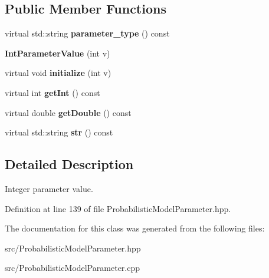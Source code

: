\subsection*{Public Member Functions}
\begin{DoxyCompactItemize}
\item 
\mbox{\label{classtops_1_1IntParameterValue_a4c4458e9fb9509cb6959257d7035bb20}} 
virtual std\+::string {\bfseries parameter\+\_\+type} () const
\item 
\mbox{\label{classtops_1_1IntParameterValue_a35cff2ce88a5d73eb510543a81c8c805}} 
{\bfseries Int\+Parameter\+Value} (int v)
\item 
\mbox{\label{classtops_1_1IntParameterValue_a21227ec31bb4b8ec1a7a61d999fd6f1f}} 
virtual void {\bfseries initialize} (int v)
\item 
\mbox{\label{classtops_1_1IntParameterValue_ae2a9175c5445b7c646488ce6787474c4}} 
virtual int {\bfseries get\+Int} () const
\item 
\mbox{\label{classtops_1_1IntParameterValue_a8fe32407d02e74a18c4bf5b0223d7897}} 
virtual double {\bfseries get\+Double} () const
\item 
\mbox{\label{classtops_1_1IntParameterValue_a199dc24b035a7e55136edae7912ec6a1}} 
virtual std\+::string {\bfseries str} () const
\end{DoxyCompactItemize}


\subsection{Detailed Description}
Integer parameter value. 

Definition at line 139 of file Probabilistic\+Model\+Parameter.\+hpp.



The documentation for this class was generated from the following files\+:\begin{DoxyCompactItemize}
\item 
src/Probabilistic\+Model\+Parameter.\+hpp\item 
src/Probabilistic\+Model\+Parameter.\+cpp\end{DoxyCompactItemize}
